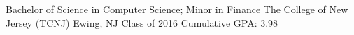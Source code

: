 

\begin{cventries}

  \cventry
    {Bachelor of Science in Computer Science; Minor in Finance} %
    {The College of New Jersey (TCNJ)} %
    {Ewing, NJ} %
    {Class of 2016} %
    {Cumulative GPA: 3.98}

\end{cventries}
